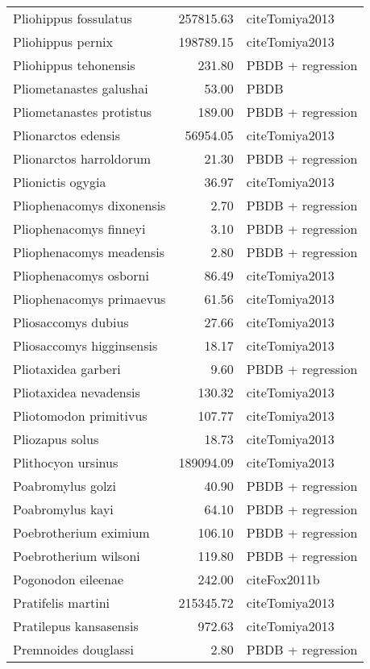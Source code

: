 \begin{table}[ht]
\begin{tabular}{lrl}
  Pliohippus fossulatus & 257815.63 & cite{Tomiya2013} \\ 
  Pliohippus pernix & 198789.15 & cite{Tomiya2013} \\ 
  Pliohippus tehonensis & 231.80 & PBDB + regression \\ 
  Pliometanastes galushai & 53.00 & PBDB \\ 
  Pliometanastes protistus & 189.00 & PBDB + regression \\ 
  Plionarctos edensis & 56954.05 & cite{Tomiya2013} \\ 
  Plionarctos harroldorum & 21.30 & PBDB + regression \\ 
  Plionictis ogygia & 36.97 & cite{Tomiya2013} \\ 
  Pliophenacomys dixonensis & 2.70 & PBDB + regression \\ 
  Pliophenacomys finneyi & 3.10 & PBDB + regression \\ 
  Pliophenacomys meadensis & 2.80 & PBDB + regression \\ 
  Pliophenacomys osborni & 86.49 & cite{Tomiya2013} \\ 
  Pliophenacomys primaevus & 61.56 & cite{Tomiya2013} \\ 
  Pliosaccomys dubius & 27.66 & cite{Tomiya2013} \\ 
  Pliosaccomys higginsensis & 18.17 & cite{Tomiya2013} \\ 
  Pliotaxidea garberi & 9.60 & PBDB + regression \\ 
  Pliotaxidea nevadensis & 130.32 & cite{Tomiya2013} \\ 
  Pliotomodon primitivus & 107.77 & cite{Tomiya2013} \\ 
  Pliozapus solus & 18.73 & cite{Tomiya2013} \\ 
  Plithocyon ursinus & 189094.09 & cite{Tomiya2013} \\ 
  Poabromylus golzi & 40.90 & PBDB + regression \\ 
  Poabromylus kayi & 64.10 & PBDB + regression \\ 
  Poebrotherium eximium & 106.10 & PBDB + regression \\ 
  Poebrotherium wilsoni & 119.80 & PBDB + regression \\ 
  Pogonodon eileenae & 242.00 & cite{Fox2011b} \\ 
  Pratifelis martini & 215345.72 & cite{Tomiya2013} \\ 
  Pratilepus kansasensis & 972.63 & cite{Tomiya2013} \\ 
  Premnoides douglassi & 2.80 & PBDB + regression \\ 

\end{tabular}
\end{table}
